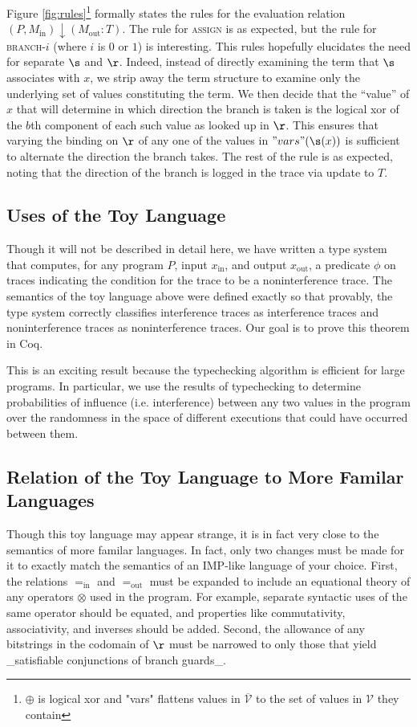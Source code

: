 \documentclass{article}
\newcommand{\V}{\ensuremath{\mathcal{V}}\xspace}
\newcommand{\Vbar}{\ensuremath{\overline{\mathcal{V}}}\xspace}
\newcommand{\evalT}[4]{\ensuremath{(#1, #2) \downarrow (#3 : #4)}}
\renewcommand{\sin}{_{\text{in}}}
\newcommand{\sout}{_{\text{out}}}
\newcommand{\eqin}{\ensuremath{=\sin}\xspace}
\newcommand{\eqout}{\ensuremath{=\sout}\xspace}
\newcommand{\Min}{\ensuremath{M\sin}\xspace}
\newcommand{\Mout}{\ensuremath{M\sout}\xspace}
\theoremstyle{definition}
\begin{document}
Figure \ref{fig:rules}\footnote{$\oplus$ is logical xor and "vars" flattens values in \Vbar to the set of values in \V they contain} formally states the rules for the evaluation relation $\evalT{P}{\Min}{\Mout}{T}$. The rule for \textsc{assign} is as expected, but the rule for \textsc{branch-}$i$ (where $i$ is $0$ or $1$) is interesting. This rules hopefully elucidates the need for separate $\s$ and $\r$. Indeed, instead of directly examining the term that $\s$ associates with $x$, we strip away the term structure to examine only the underlying set of values constituting the term. We then decide that the ``value'' of $x$ that will determine in which direction the branch is taken is the logical xor of the $b$th component of each such value as looked up in $\r$. This ensures that varying the binding on $\r$ of any one of the values in $"vars"(\s(x))$ is sufficient to alternate the direction the branch takes. The rest of the rule is as expected, noting that the direction of the branch is logged in the trace via update to $T$.

\subsection*{Uses of the Toy Language}

Though it will not be described in detail here, we have written a type system that computes, for any program $P$, input $x\sin$, and output $x\sout$, a predicate $\phi$ on traces indicating the condition for the trace to be a noninterference trace. The semantics of the toy language above were defined exactly so that provably, the type system correctly classifies interference traces as interference traces and noninterference traces as noninterference traces. Our goal is to prove this theorem in Coq.

This is an exciting result because the typechecking algorithm is efficient for large programs. In particular, we use the results of typechecking to determine probabilities of influence (i.e. interference) between any two values in the program over the randomness in the space of different executions that could have occurred between them.


\subsection*{Relation of the Toy Language to More Familar Languages}

Though this toy language may appear strange, it is in fact very close to the semantics of more familar languages. In fact, only two changes must be made for it to exactly match the semantics of an IMP-like language of your choice. First, the relations \eqin and \eqout must be expanded to include an equational theory of any operators $\otimes$ used in the program. For example, separate syntactic uses of the same operator should be equated, and properties like commutativity, associativity, and inverses should be added. Second, the allowance of any bitstrings in the codomain of $\r$ must be narrowed to only those that yield _satisfiable conjunctions of branch guards_. 
\end{document}
